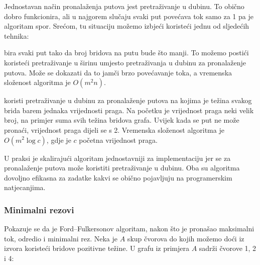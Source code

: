 Jednostavan način pronalaženja putova jest pretraživanje u dubinu.
To obično dobro funkcionira, ali u najgorem slučaju
svaki put povećava tok samo za 1
pa je algoritam spor.
Srećom, tu situaciju možemo izbjeći
koristeći jednu od sljedećih tehnika:


 \cite{edm72}
bira svaki put tako da broj bridova
na putu bude što manji.
To možemo postići koristeći pretraživanje u širinu
umjesto pretraživanja u dubinu za pronalaženje putova.
Može se dokazati da to jamči
brzo povećavanje toka, a vremenska složenost
algoritma je $O(m^2 n)$.


 \cite{ahu91} koristi pretraživanje
u dubinu za pronalaženje putova na kojima je težina svakog brida
barem jednaka vrijednosti praga.
Na početku je vrijednost praga
neki velik broj, na primjer suma svih
težina bridova grafa.
Uvijek kada se put ne može pronaći,
vrijednost praga dijeli se s 2.
Vremenska složenost algoritma je $O(m^2 \log c)$,
gdje je $c$ početna vrijednost praga.

U praksi je skalirajući algoritam jednostavniji za implementaciju
jer se za pronalaženje putova može koristiti pretraživanje u dubinu.
Oba su algoritma dovoljno efikasna za zadatke
kakvi se obično pojavljuju na programerskim natjecanjima.

\subsubsection{Minimalni rezovi}


Pokazuje se da je Ford–Fulkersonov algoritam,
nakon što je pronašao maksimalni tok,
odredio i minimalni rez.
Neka je $A$ skup čvorova
do kojih možemo doći iz izvora
koristeći bridove pozitivne težine.
U grafu iz primjera $A$ sadrži čvorove 1, 2 i 4:

